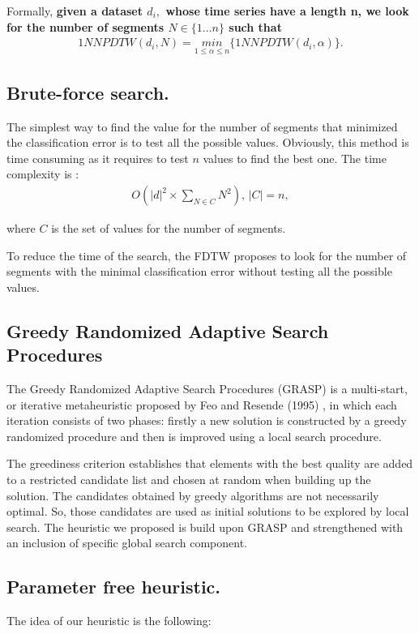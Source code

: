 Formally, \textbf{ given a dataset $d_i,$ whose time series have a length n, we look for the number
of segments $N \in \{1 \ldots n \}$ such that}
\begin{eqnarray}
1NNPDTW(d_{i},N)=\underset{1\leq\alpha\leq n}{min}\{1NNPDTW(d_i,\alpha)\}.
\end{eqnarray}


\subsection{Brute-force search.}

The simplest way to find the value for the number of segments that minimized the
classification error is to test all the possible values.  Obviously, this
method is time consuming as it requires to test $n$ values to find the best one. The time complexity is :
\begin{eqnarray}
O(|d|^{2} \times \underset{N\in C}{\sum}{\displaystyle
N^{2}}),\, |C|=n,
\end{eqnarray}

where $C$ is the set of values for the number of segments.

To reduce the time of the search, the FDTW proposes to look for the
number of segments with the minimal classification error without testing all the possible values.

\subsection{ Greedy Randomized Adaptive Search Procedures}
The Greedy Randomized Adaptive Search Procedures (GRASP) is a multi-start, or iterative metaheuristic proposed by Feo and Resende
(1995) \cite{feo1995greedy}, in which each iteration consists of two phases:
firstly a new solution is constructed by a greedy randomized
procedure and  then is improved using a local search procedure.


The greediness criterion establishes that elements with the best quality are
 added to a restricted candidate list and chosen at random when
building up the solution. The candidates obtained by greedy algorithms are not
necessarily optimal. So, those candidates are  used as initial solutions
to be explored by local search. The heuristic  we proposed is build upon
GRASP and strengthened with an inclusion of specific global search component.




\subsection{Parameter free heuristic.}
The idea of our heuristic is the following:
